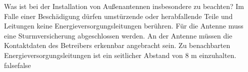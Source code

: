     {Was ist bei der Installation von Außenantennen insbesondere zu beachten?}
    {Im Falle einer Beschädigung dürfen umstürzende oder herabfallende Teile und Leitungen keine Energieversorgungsleitungen berühren.}
    {Für die Antenne muss eine Sturmversicherung abgeschlossen werden.}
    {An der Antenne müssen die Kontaktdaten des Betreibers erkennbar angebracht sein.}
    {Zu benachbarten Energieversorgungsleitungen ist ein seitlicher Abstand von 8 m einzuhalten.}
    {false}{false}